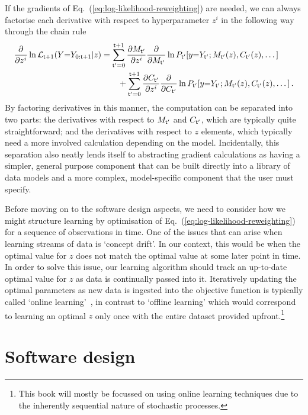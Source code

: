 If the gradients of Eq.~(\ref{eq:log-likelihood-reweighting}) are needed, we can always factorise each derivative with respect to hyperparameter $z^i$ in the following way through the chain rule
\begin{align}
\frac{\partial}{\partial z^i}\ln {\cal L}_{{\sf t}+1}(Y{=}Y_{0:{\sf t}+1} \vert z) &= \sum_{{\sf t}'=0}^{{\sf t}+1}\frac{\partial M_{{\sf t}'}}{\partial z^i}\frac{\partial}{\partial M_{{\sf t}'}}\ln P_{{\sf t}'}[y{=}Y_{{\sf t}'};M_{{\sf t}'}(z),C_{{\sf t}'}(z),\dots ] \nonumber \\ 
&\qquad + \sum_{{\sf t}'=0}^{{\sf t}+1}\frac{\partial C_{{\sf t}'}}{\partial z^i}\frac{\partial }{\partial C_{{\sf t}'}}\ln P_{{\sf t}'}[y{=}Y_{{\sf t}'};M_{{\sf t}'}(z),C_{{\sf t}'}(z),\dots ] \,. \label{eq:log-likelihood-reweighting-grad}
\end{align}
By factoring derivatives in this manner, the computation can be separated into two parts: the derivatives with respect to $M_{{\sf t}'}$ and $C_{{\sf t}'}$, which are typically quite straightforward; and the derivatives with respect to $z$ elements, which typically need a more involved calculation depending on the model. Incidentally, this separation also neatly lends itself to abstracting gradient calculations as having a simpler, general purpose component that can be built directly into a library of data models and a more complex, model-specific component that the user must specify.

Before moving on to the software design aspects, we need to consider how we might structure learning by optimisation of Eq.~(\ref{eq:log-likelihood-reweighting}) for a sequence of observations in time. One of the issues that can arise when learning streams of data is `concept drift'. In our context, this would be when the optimal value for $z$ does not match the optimal value at some later point in time. In order to solve this issue, our learning algorithm should track an up-to-date optimal value for $z$ as data is continually passed into it. Iteratively updating the optimal parameters as new data is ingested into the objective function is typically called `online learning'~\cite{hazan2016introduction,sutton2018reinforcement}, in contrast to `offline learning' which would correspond to learning an optimal $z$ only once with the entire dataset provided upfront.\footnote{This book will mostly be focussed on using online learning techniques due to the inherently sequential nature of stochastic processes.}


\section{\sffamily Software design}

